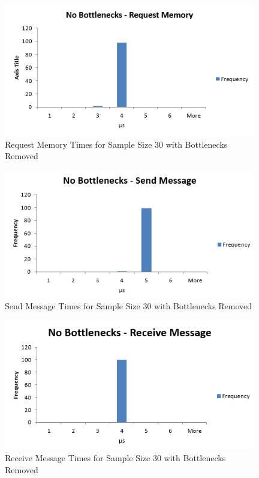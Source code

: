 \documentclass[se]{uw-wkrpt}
\begin{document}
\begin{figure}[bp!]
\centering
\includegraphics[width=110mm]{NB-RequestMemoryHistogram.png}
\caption{Request Memory Times for Sample Size 30 with Bottlenecks Removed}
\label{fig:mem-nobottlenecks}
\end{figure}

\begin{figure}[bp!]
\centering
\includegraphics[width=110mm]{NB-SendMessageHistogram.png}
\caption{Send Message Times for Sample Size 30 with Bottlenecks Removed}
\label{fig:send-nobottlenecks}
\end{figure}

\begin{figure}[bp!]
\centering
\includegraphics[width=110mm]{NB-ReceiveMessageHistogram.png}
\caption{Receive Message Times for Sample Size 30 with Bottlenecks Removed}
\label{fig:receive-nobottlenecks}
\end{figure}
\end{document}
